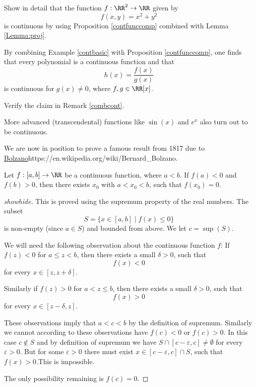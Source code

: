 \documentclass{article}
\begin{document}
\beginshex
Show in detail that the function $f: \RR^2\rightarrow \RR$ given by
$$
f(x, y) = x^2 + y^2
$$
is continuous by using Proposition \ref{contfunccomp} combined with 
Lemma \ref{Lemma:proj}.
\endshex

\begin{frameit}
\begin{remark}\label{combcont}
  By combining Example \ref{contbasic} with Proposition \ref{contfunccomp}, one finds that
  every polynomial is a continuous function and that
  $$
  h(x) = \frac{f(x)}{g(x)}
  $$
  is continuous for $g(x)\neq 0$, where $f, g\in \RR[x]$.
\end{remark}
\end{frameit}

\beginshex
Verify the claim in Remark \ref{combcont}.
\endshex

More advanced (transcendental) functions like $\sin(x)$ and $e^x$ also turn out to be continuous.


We are now in position to prove a famous result from 1817 due to \url{Bolzano}{https://en.wikipedia.org/wiki/Bernard_Bolzano}. 

\begin{theorem}[emph]\label{Bolzano}
  Let $f: [a, b]\rightarrow \RR$ be a continuous function, where $a < b$. If
  $f(a) < 0$ and $f(b) > 0$, then there exists $x_0$ with $a < x_0 < b$, such
  that $f(x_0) = 0$.
\end{theorem}

  \begin{proof}[showhide]
    This is proved using the supremum property of the real numbers. The subset
    $$
    S = \{x\in [a, b]\mid f(x) \leq 0\}
    $$
    is non-empty (since $a\in S$) and bounded from above. We let $c = \sup(S)$.

    We will need the following observation about the continuous function $f$:
    If $f(z) < 0$ for $a \leq z < b$, then there exists a small
    $\delta > 0$, such that
    $$
    f(x) < 0
    $$
    for every $x\in [z, z+\delta]$.

    Similarly if $f(z) > 0$ for $a <  z \leq b$, then there exists a small
    $\delta > 0$, such that
    $$
    f(x) > 0
    $$
    for every $x\in [z - \delta, z]$.

    These observations imply that $a < c < b$ by the definition
    of supremum. Similarly we cannot according to these
    observations have $f(c) < 0$ or $f(c) > 0$.
    In this case $c\not\in S$ and by definition of supremum we have $S\cap [c-\varepsilon, c] \neq \emptyset$ for every $\varepsilon > 0$. But for some $\varepsilon>0$ there must exist $x\in [c-\varepsilon, c]\cap S$, such that $f(x) > 0$.This is impossible.

    The only possibility remaining is $f(c) = 0$.
  \end{proof}
\end{document}
